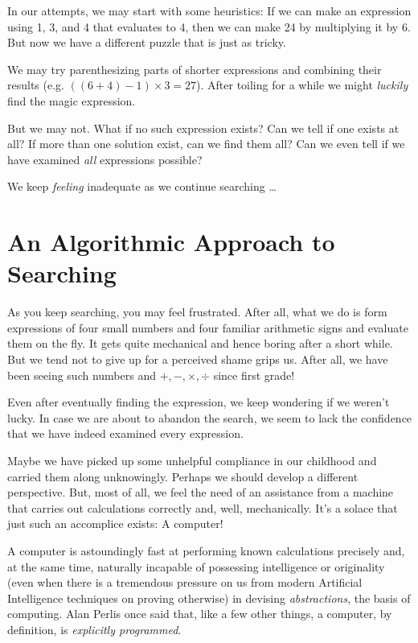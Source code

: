 \documentclass[english,smartquotes]{hgbarticle}
\begin{document}
In our attempts, we may start with some heuristics: If we can make an expression using 1, 3, and 4 that evaluates to 4, then we can make 24 by multiplying it by 6. But now we have a different puzzle that is just as tricky.

We may try parenthesizing parts of shorter expressions and combining their results (e.g. $((6+4)-1)\times3 = 27$). After toiling for a while we might \textit{luckily} find the magic expression.

But we may not. What if no such expression exists? Can we tell if one exists at all? If more than one solution exist, can we find them all? Can we even tell if we have examined \textit{all} expressions possible?

We keep \textit{feeling} inadequate as we continue searching \dots
\section{An Algorithmic Approach to Searching}
As you keep searching, you may feel frustrated. After all, what we do is form expressions of four small numbers and four familiar arithmetic signs and evaluate them on the fly. It gets quite mechanical and hence boring after a short while. But we tend not to give up for a perceived shame grips us. After all, we have been seeing such numbers and $+, -, \times, \div$ since first grade!

Even after eventually finding the expression, we keep wondering if we weren't lucky. In case we are about to abandon the search, we seem to lack the confidence that we have indeed examined every expression. 

Maybe we have picked up some unhelpful compliance in our childhood and carried them along unknowingly. Perhaps we should develop a different perspective. But, most of all, we feel the need of an assistance from a machine that carries out calculations correctly and, well, mechanically. It's a solace that just such an accomplice exists: A computer! 

A computer is astoundingly fast at performing known calculations precisely and, at the same time, naturally incapable of possessing intelligence or originality (even when there is a tremendous pressure on us from modern Artificial Intelligence techniques on proving otherwise) in devising \textit{abstractions}, the basis of computing. Alan Perlis once said \cite{Perlis1984} that, like a few other things, a computer, by definition, is \textit{explicitly programmed}. 
\end{document}
